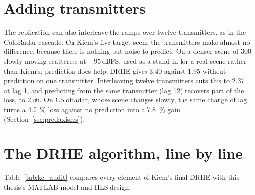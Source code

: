 \section{Adding transmitters}
\label{sec:kr_tdm}

The replication can also interleave the ramps over twelve transmitters, as in
the ColoRadar cascade. On Kiem's five-target scene the transmitters make almost
no difference, because there is nothing but noise to predict. On a denser scene
of 300 slowly moving scatterers at $-95$\,dBFS, used as a stand-in for a real
scene rather than Kiem's, prediction does help: DRHE gives 3.40 against 1.95
without prediction on one transmitter. Interleaving twelve transmitters cuts
this to 2.37 at lag 1, and predicting from the same transmitter (lag 12)
recovers part of the loss, to 2.56. On ColoRadar, whose scene changes slowly,
the same change of lag turns a \SI{4.9}{\percent} loss against no prediction
into a \SI{7.8}{\percent} gain (Section~\ref{sec:predaxisres}).

\section{The DRHE algorithm, line by line}
\label{sec:kc_audit}

Table~\ref{tab:kc_audit} compares every element of Kiem's final DRHE with this
thesis's MATLAB model and HLS design.

